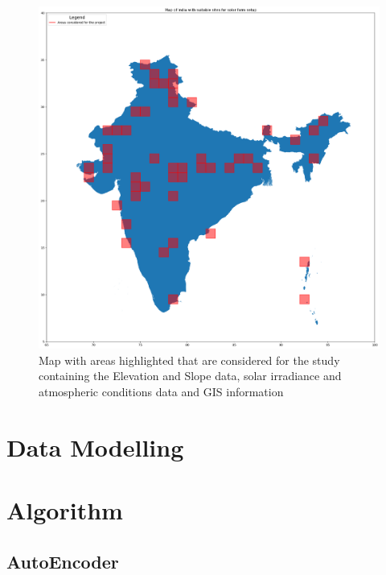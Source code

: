 \documentclass[a4paper,12pt]{Classes/RoboticsLaTeX}
\begin{document}
	\begin{figure}[H]
		\centering
		\includegraphics[width=1\textwidth]{Figures/india_map_with_highlighted_data.png} %
		\caption{Map with areas highlighted that are considered for the study containing the Elevation and Slope data, solar irradiance and atmospheric conditions data and GIS information}
		\label{fig:my_label5} %
	\end{figure}
	
	
		
		
		
		
		
		
		
		
		
		
		
		

	\section{Data Modelling}

	\section{Algorithm}
	\subsection{AutoEncoder}
\end{document}
